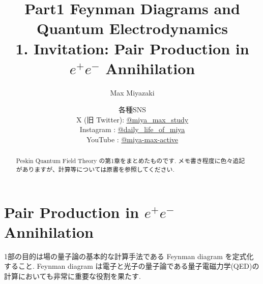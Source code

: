 \documentclass[a4paper,12pt]{article}
\title{Part1 Feynman Diagrams and Quantum Electrodynamics\\
1. Invitation: Pair Production in $e^+ e^-$ Annihilation}
\date{各種SNS\\
    X (旧 Twitter): \href{https://x.com/miya_max_study}{@miya\_max\_study}\\
    Instagram : \href{https://www.instagram.com/daily_life_of_miya/}{@daily\_life\_of\_miya}\\
    YouTube : \href{https://www.youtube.com/@miya-max-active}{@miya-max-active}
    }
\author{Max Miyazaki}
\begin{document}
\maketitle

\vspace{1cm}
\begin{abstract}
    Peskin Quantum Field Theory の第1章をまとめたものです. メモ書き程度に色々追記がありますが、計算等については原書を参照してください.
\end{abstract}


\newpage
\section{\textrm{Pair Production in $e^+ e^-$ Annihilation}}
1部の目的は場の量子論の基本的な計算手法である Feynman diagram を定式化すること. Feynman diagram は電子と光子の量子論である量子電磁力学(QED)の計算においても非常に重要な役割を果たす.
\end{document}
